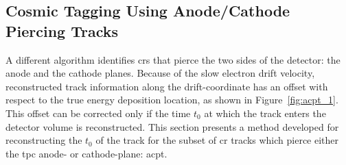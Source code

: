 \subsection[Cosmic Tagging: ACPT]{Cosmic Tagging Using Anode/Cathode Piercing Tracks}

A different algorithm identifies \acrshort{cr}s that pierce the two sides of the detector: the anode and the cathode planes. 
Because of the slow electron drift velocity, reconstructed track information along the drift-coordinate has an offset with respect to the true energy deposition location, as shown in Figure~\ref{fig:acpt_1}. This offset can be corrected only if the time $t_0$ at which the track enters the detector volume is reconstructed. This section presents a method developed for reconstructing the $t_0$ of the track for the subset of \acrshort{cr} tracks which pierce either the \acrshort{tpc} anode- or cathode-plane: \acrfull{acpt}.


